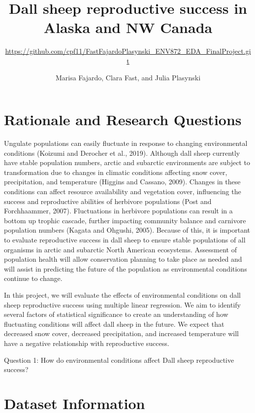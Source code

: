 \documentclass[
  12pt,
]{article}
\title{Dall sheep reproductive success in Alaska and NW Canada}
\subtitle{\url{https://github.com/cpf11/FastFajardoPlasynski_ENV872_EDA_FinalProject.git}}
\author{Marisa Fajardo, Clara Fast, and Julia Plasynski}
\date{}
\begin{document}
\maketitle

\newpage
\tableofcontents 
\newpage
\listoftables 
\newpage
\listoffigures 
\newpage

\hypertarget{rationale-and-research-questions}{%
\section{Rationale and Research
Questions}\label{rationale-and-research-questions}}

Ungulate populations can easily fluctuate in response to changing
environmental conditions (Koizumi and Derocher et al., 2019). Although
dall sheep currently have stable population numbers, arctic and
subarctic environments are subject to transformation due to changes in
climatic conditions affecting snow cover, precipitation, and temperature
(Higgins and Cassano, 2009). Changes in these conditions can affect
resource availability and vegetation cover, influencing the success and
reproductive abilities of herbivore populations (Post and Forchhaammer,
2007). Fluctuations in herbivore populations can result in a bottom up
trophic cascade, further impacting community balance and carnivore
population numbers (Kagata and Ohgushi, 2005). Because of this, it is
important to evaluate reproductive success in dall sheep to ensure
stable populations of all organisms in arctic and subarctic North
American ecosystems. Assessment of population health will allow
conservation planning to take place as needed and will assist in
predicting the future of the population as environmental conditions
continue to change.

In this project, we will evaluate the effects of environmental
conditions on dall sheep reproductive success using multiple linear
regression. We aim to identify several factors of statistical
significance to create an understanding of how fluctuating conditions
will affect dall sheep in the future. We expect that decreased snow
cover, decreased precipitation, and increased temperature will have a
negative relationship with reproductive success.

Question 1: How do environmental conditions affect Dall sheep
reproductive success?

\newpage

\hypertarget{dataset-information}{%
\section{Dataset Information}\label{dataset-information}}
\end{document}
